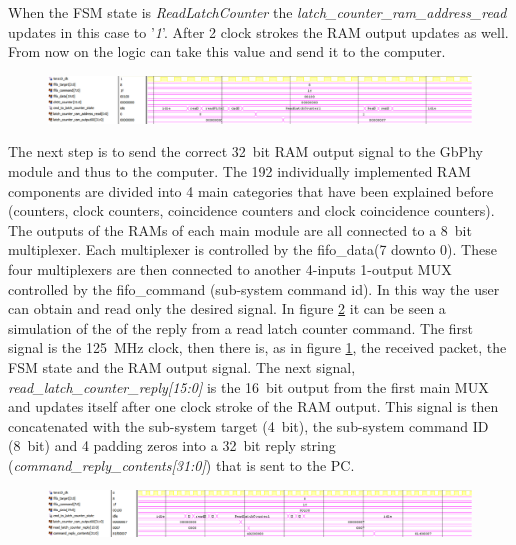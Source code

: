 \noindent When the FSM state is \textit{ReadLatchCounter} the \textit{latch\_counter\_ram\_address\_read} updates in this case to '\textit{1}'. After 2 clock strokes the RAM output updates as well. From now on the logic can take this value and send it to the computer. 
\begin{figure}[H]
	\centering
	\includegraphics[width=1.0\linewidth]{IMG/ch4/LATCHsimulations/READLATCH}
	\caption{}
	\label{fig:readlatch}
\end{figure}
\noindent The next step is to send the correct 32~bit RAM output signal to the GbPhy module and thus to the computer.
The 192 individually implemented RAM components are divided into 4 main categories that have been explained before (counters, clock counters, coincidence counters and clock coincidence counters).
The outputs of the RAMs of each main module are all connected to a 8~bit multiplexer. Each multiplexer is controlled by the fifo\_data(7 downto 0). These four multiplexers are then connected to another 4-inputs 1-output MUX controlled by the fifo\_command (sub-system command id). In this way the user can obtain and read only the desired signal.
In figure \ref{fig:replylatch} it can be seen a simulation of the of the reply from a read latch counter command.
The first signal is the 125~MHz clock, then there is, as in figure \ref{fig:readlatch}, the received packet, the FSM state and the RAM output signal.
The next signal, \textit{read\_latch\_counter\_reply[15:0]} is the 16~bit output from the first main MUX and updates itself after one clock stroke of the RAM output.
This signal is then concatenated with the sub-system target (4~bit), the sub-system command ID (8~bit) and 4 padding zeros into a 32~bit reply string (\textit{command\_reply\_contents[31:0]}) that is sent to the PC. 
\begin{figure}[H]
	\centering
	\includegraphics[width=1.0\linewidth]{IMG/ch4/LATCHsimulations/REPLYLATCH}
	\caption{}
	\label{fig:replylatch}
\end{figure}
